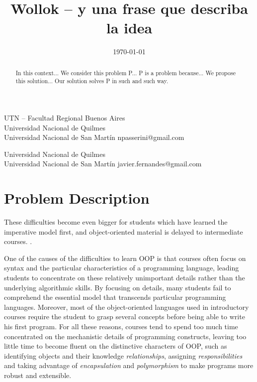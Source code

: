 \documentclass[preprint,10pt]{sigplanconf}
\begin{document}
\title{Wollok -- y una frase que describa la idea}
  {UTN -- Facultad Regional Buenos Aires \\ Universidad Nacional de Quilmes \\ Universidad Nacional de San Martín}
  {npasserini@gmail.com}
  
  {Universidad Nacional de Quilmes \\ Universidad Nacional de San Martín}
  {javier.fernandes@gmail.com}

\date{\today}
\maketitle

\begin{abstract}
In this context...
We consider this problem P...
P is a problem because...
We propose this solution...
Our solution solves P in such and such way.
\end{abstract}



\section{Problem Description}
\label{sec:problem}




These difficulties become even bigger for students which have learned the imperative model first,
and object-oriented material is delayed to intermediate courses. \cite{cooper_teaching_2003}.

One of the causes of the difficulties to learn OOP is that courses often focus on syntax and the particular characteristics of a
programming language, leading students to concentrate on these relatively unimportant details rather than the underlying algorithmic skills. 
By focusing on details, many students fail to comprehend the essential model that transcends particular programming languages\cite{the_joint_task_force_on_computing_curricula_computing_2001}. 
Moreover, most of the object-oriented languages used in introductory courses require the student to grasp several concepts before being able to write his first program.
For all these reasons, courses tend to spend too much time concentrated on the mechanistic details of programming constructs, 
leaving too little time to become fluent on the distinctive characters of OOP, 
such as identifying objects and their knowledge \emph{relationships}, assigning \emph{responsibilities} 
and taking advantage of \emph{encapsulation} and \emph{polymorphism} to make programs more robust and extensible.
\end{document}
